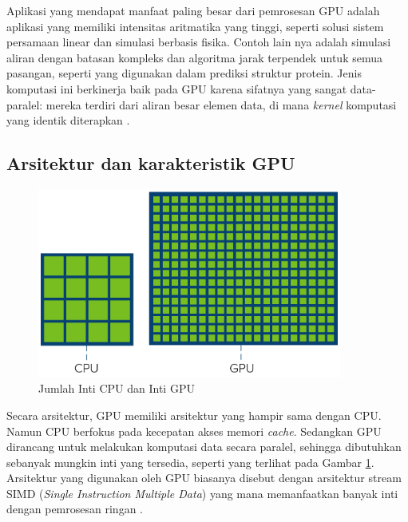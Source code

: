 Aplikasi yang mendapat manfaat paling besar dari pemrosesan GPU adalah aplikasi
yang memiliki intensitas aritmatika yang tinggi, seperti solusi sistem
persamaan linear dan simulasi berbasis fisika. Contoh lain nya adalah simulasi
aliran dengan batasan kompleks dan algoritma jarak terpendek untuk semua
pasangan, seperti yang digunakan dalam prediksi struktur protein. Jenis
komputasi ini berkinerja baik pada GPU karena sifatnya yang sangat
data-paralel: mereka terdiri dari aliran besar elemen data, di mana \emph{kernel}
komputasi yang identik diterapkan \citep{pharrGPUGemsProgramming2005}.

\subsection{Arsitektur dan karakteristik GPU}


\begin{figure}[H]
	\centering
	\includegraphics[width=10cm]{images/cpu-vs-gpu-cores.png}
	\caption{Jumlah Inti CPU dan Inti GPU}
	\label{gambar gpu-cpu cores}
\end{figure}

Secara arsitektur, GPU memiliki arsitektur yang hampir sama dengan CPU. Namun
CPU berfokus pada kecepatan akses memori \emph{cache}. Sedangkan GPU dirancang untuk
melakukan komputasi data secara paralel, sehingga dibutuhkan sebanyak mungkin
inti yang tersedia, seperti yang terlihat pada Gambar \ref{gambar gpu-cpu cores}.
Arsitektur yang digunakan oleh GPU biasanya disebut dengan arsitektur
stream SIMD (\emph{Single Instruction Multiple Data}) yang mana memanfaatkan
banyak inti dengan pemrosesan ringan \citep{helenGPUArchitectureStructure2020}.



